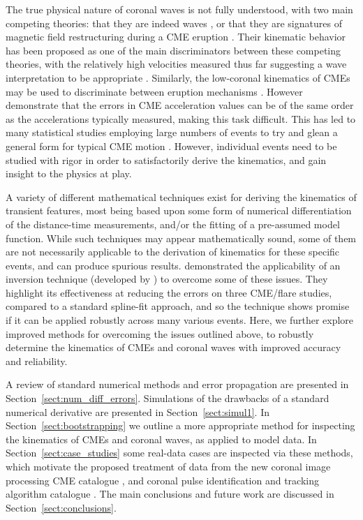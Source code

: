 \documentclass[structabstract]{aa}
\begin{document}
The true physical nature of coronal waves is not fully understood, with two main competing theories: that they are indeed waves \citep[e.g.,][]{2012ApJ...754....7S,2010ApJ...716L..57V}, or that they are signatures of magnetic field restructuring during a CME eruption \citep[e.g.,][]{2011ApJ...738..167S,2011ApJ...732L..20C}. Their kinematic behavior has been proposed as one of the main discriminators between these competing theories, with the relatively high velocities measured thus far suggesting a wave interpretation to be appropriate \citep{2012ApJ...753..112Z, 2011A&A...532A.151W}. Similarly, the low-coronal kinematics of CMEs may be used to discriminate between eruption mechanisms \citep[see, for example,][and the CME models discussed therein]{2010A&A...516A..44L}. However \citet{2007ApJ...657.1117W} demonstrate that the errors in CME acceleration values can be of the same order as the accelerations typically measured, making this task difficult. This has led to many statistical studies employing large numbers of events to try and glean a general form for typical CME motion \citep[e.g.,][]{2006ApJ...649.1100Z, 2003AdSpR..32.2637D, 2000GeoRL..27..145G}. However, individual events need to be studied with rigor in order to satisfactorily derive the kinematics, and gain insight to the physics at play.

A variety of different mathematical techniques exist for deriving the kinematics of transient features, most being based upon some form of numerical differentiation of the distance-time measurements, and/or the fitting of a pre-assumed model function. While such techniques may appear mathematically sound, some of them are not necessarily applicable to the derivation of kinematics for these specific events, and can produce spurious results. \citet{2010ApJ...712.1410T} demonstrated the applicability of an inversion technique (developed by \citealt{2005SoPh..227..299K}) to overcome some of these issues. They highlight its effectiveness at reducing the errors on three CME/flare studies, compared to a standard spline-fit approach, and so the technique shows promise if it can be applied robustly across many various events. Here, we further explore improved methods for overcoming the issues outlined above, to robustly determine the kinematics of CMEs and coronal waves with improved accuracy and reliability.

A review of standard numerical methods and error propagation are presented in Section~\ref{sect:num_diff_errors}. Simulations of the drawbacks of a standard numerical derivative are presented in Section~\ref{sect:simul1}. In Section~\ref{sect:bootstrapping} we outline a more appropriate method for inspecting the  kinematics of CMEs and coronal waves, as applied to model data. In Section~\ref{sect:case_studies} some real-data cases are inspected via these methods, which motivate the proposed treatment of data from the new coronal image processing CME catalogue \citep[CORIMP;][]{2012ApJ...752..144M, 2012ApJ...752..145B}, and coronal pulse identification and tracking algorithm catalogue \citep[CorPITA;][]{2011A&A...531A..42L}. The main conclusions and future work are discussed in Section~\ref{sect:conclusions}.
\end{document}
